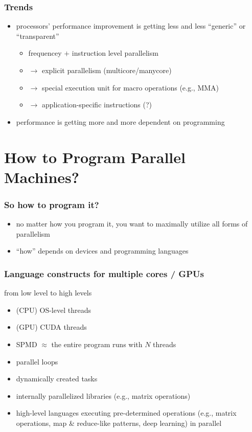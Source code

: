 \documentclass[12pt,dvipdfmx]{beamer}
\newcommand{\ao}[1]{{\color{blue}#1}}
\begin{document}
\begin{frame}
\frametitle{Trends}
\begin{itemize}
\item processors' performance improvement is getting less and less ``generic'' or ``transparent''
  \begin{itemize}
  \item frequencey $+$ instruction level parallelism
  \item [] $\rightarrow$ explicit parallelism (multicore/manycore)
  \item [] $\rightarrow$ special execution unit for macro operations (e.g., MMA)
  \item [] $\rightarrow$ application-specific instructions (?)
  \end{itemize}
\item performance is getting more and more dependent on programming 
\end{itemize}
\end{frame}

\section{How to Program Parallel Machines?}

\begin{frame}
\frametitle{So how to program it?}

\begin{itemize}
\item no matter how you program it, you want to maximally utilize 
  all forms of parallelism
\item ``how'' depends on devices and programming languages 
\end{itemize}
\end{frame}

\begin{frame}
\frametitle{Language constructs for multiple cores / GPUs}
from low level to high levels
\begin{itemize}
\item (CPU) OS-level threads 
\item (GPU) CUDA threads
\item \ao{SPMD} $\approx$ the entire program runs with $N$ threads
\item \ao{parallel loops}
\item dynamically created \ao{tasks}
\item internally parallelized \ao{libraries} (e.g., matrix operations)
\item high-level languages executing pre-determined operations 
  (e.g., matrix operations, \ao{map \& reduce}-like patterns, deep learning) in parallel
\end{itemize}
\end{frame}
\end{document}
